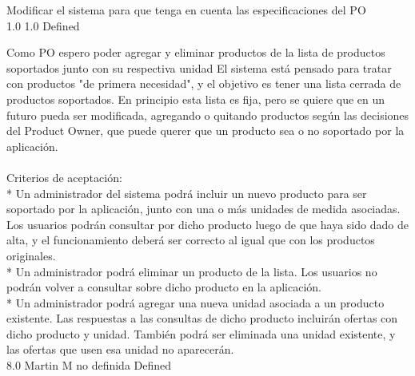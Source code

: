 		{Modificar el sistema para que tenga en cuenta las especificaciones del PO} %
		{\\
} %
		{1.0} %
		{} %
		{1.0} %
		{Defined} %


\vspace{20pt}

	{Como PO espero poder agregar y eliminar productos de la lista de productos soportados junto con su respectiva unidad} %
	{El sistema está pensado para tratar con productos "de primera necesidad", y el
objetivo es tener una lista cerrada de productos soportados. En principio esta
lista es fija, pero se quiere que en un futuro pueda ser modificada, agregando
o quitando productos según las decisiones del Product Owner, que puede querer
que un producto sea o no soportado por la aplicación.\\
  \\
Criterios de aceptación:\\
* Un administrador del sistema podrá incluir un nuevo producto para ser soportado por la aplicación, junto con una o más unidades de medida asociadas. Los usuarios podrán consultar por dicho producto luego de que haya sido dado de alta, y el funcionamiento deberá ser correcto al igual que con los productos originales.  \\
* Un administrador podrá eliminar un producto de la lista. Los usuarios no podrán volver a consultar sobre dicho producto en la aplicación.  \\
* Un administrador podrá agregar una nueva unidad asociada a un producto existente. Las respuestas a las consultas de dicho producto incluirán ofertas con dicho producto y unidad. También podrá ser eliminada una unidad existente, y las ofertas que usen esa unidad no aparecerán.\\
} %
	{} %
	{8.0} %
	{Martin M} %
	{no definida} %
	{Defined} %


\vspace{20pt}

